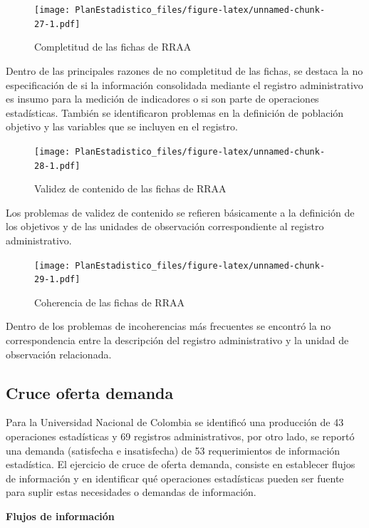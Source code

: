 \documentclass[
]{book}
\begin{document}
\begin{figure}
\centering
\texttt{[image: PlanEstadistico\_files/figure-latex/unnamed-chunk-27-1.pdf]}
\caption{\label{fig:unnamed-chunk-27}Completitud de las fichas de RRAA}
\end{figure}

Dentro de las principales razones de no completitud de las fichas, se destaca la no especificación
de si la información consolidada mediante el registro administrativo es insumo para la medición de
indicadores o si son parte de operaciones estadísticas. También se identificaron problemas en la
definición de población objetivo y las variables que se incluyen en el registro.

\begin{figure}
\centering
\texttt{[image: PlanEstadistico\_files/figure-latex/unnamed-chunk-28-1.pdf]}
\caption{\label{fig:unnamed-chunk-28}Validez de contenido de las fichas de RRAA}
\end{figure}

Los problemas de validez de contenido se refieren básicamente a la definición de los objetivos y de
las unidades de observación correspondiente al registro administrativo.

\begin{figure}
\centering
\texttt{[image: PlanEstadistico\_files/figure-latex/unnamed-chunk-29-1.pdf]}
\caption{\label{fig:unnamed-chunk-29}Coherencia de las fichas de RRAA}
\end{figure}

Dentro de los problemas de incoherencias más frecuentes se encontró la no correspondencia entre
la descripción del registro administrativo y la unidad de observación relacionada.

\hypertarget{cruce-oferta-demanda}{%
\subsection{Cruce oferta demanda}\label{cruce-oferta-demanda}}

Para la Universidad Nacional de Colombia se identificó una producción de 43 operaciones
estadísticas y 69 registros administrativos, por otro lado, se reportó una demanda (satisfecha e
insatisfecha) de 53 requerimientos de información estadística. El ejercicio de cruce de oferta
demanda, consiste en establecer flujos de información y en identificar qué operaciones
estadísticas pueden ser fuente para suplir estas necesidades o demandas de información.

\textbf{Flujos de información}
\end{document}
